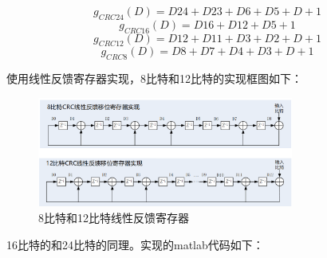 \documentclass[UTF8]{ctexart}
\begin{document}
$$ g_{CRC24}(D) = D24 + D23 + D6 + D5 + D + 1 $$
$$ g_{CRC16}(D) = D16 + D12 + D5 + 1 $$
$$ g_{CRC12}(D) = D12 + D11 + D3 + D2 + D + 1 $$
$$ g_{CRC8}(D) = D8 + D7 + D4 + D3 + D + 1 $$

使用线性反馈寄存器实现，8比特和12比特的实现框图如下：

\begin{figure}[H]
    \centering
    
    \includegraphics[width=0.75\textwidth]{pics/2.png}
    \caption{8比特和12比特线性反馈寄存器}\label{fig:2}

\end{figure}

16比特的和24比特的同理。实现的matlab代码如下：
\end{document}
